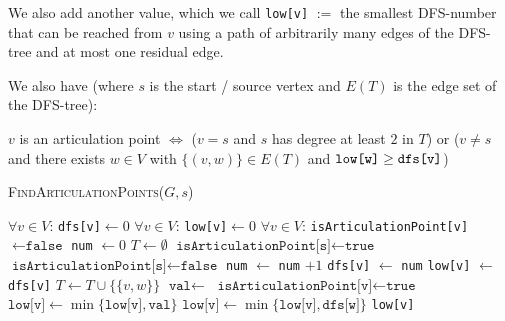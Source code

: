 We also add another value, which we call \verb|low[v]| $:=$ the smallest DFS-number that can be reached from $v$ using a path of arbitrarily many edges of the DFS-tree and at most one residual edge.

We also have (where $s$ is the start / source vertex and $E(T)$ is the edge set of the DFS-tree):

$v$ is an articulation point $\Leftrightarrow$ ($v = s$ and $s$ has degree at least $2$ in $T$) or ($v \neq s$ and there exists $w \in V$ with $\{(v, w)\} \in E(T)$ and $\verb|low[w]| \geq \verb|dfs[v]|$)


\begin{algorithm}
    \caption{\textsc{FindArticulationPoints}($G, s$)}
    \begin{algorithmic}[1]
        \State $\forall v \in V$: \texttt{dfs[v]}$\gets 0$ 
        \State $\forall v \in V$: \texttt{low[v]}$\gets 0$ 
        \State $\forall v \in V$: \texttt{isArticulationPoint[v]}$\gets \texttt{false}$ 
        \State \texttt{num} $\gets 0$
        \State $T \gets \emptyset$ 
        \State {}
         
            \State $\texttt{isArticulationPoint[s]} \gets \texttt{true}$
        \Else
            \State $\texttt{isArticulationPoint[s]} \gets \texttt{false}$
        \EndIf
            \State \texttt{num} $\gets$ \texttt{num} $+ 1$
            \State \texttt{dfs[v]} $\gets$ \texttt{num}
            \State \texttt{low[v]} $\gets$ \texttt{dfs[v]}
                    \State $T \gets T \cup \{\{v, w\}\}$
                    \State $\texttt{val} \gets$ 
                     
                        \State $\texttt{isArticulationPoint[v]} \gets \texttt{true}$
                    \EndIf
                    \State $\texttt{low[v]} \gets \min \{\texttt{low[v]}, \texttt{val}\}$
                 
                    \State $\texttt{low[v]} \gets \min \{\texttt{low[v]}, \texttt{dfs[w]}\}$
                \EndIf
            \EndFor
            \State \Return \texttt{low[v]}
        \EndProcedure
    \end{algorithmic}
\end{algorithm}

